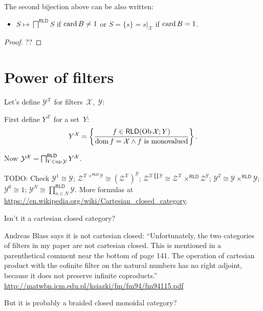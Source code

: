 \begin{prop}
  The second bijection above can be also written:

  
  \begin{itemize}
    \item $S \mapsto \bigsqcap^{\mathsf{RLD}} S$ if $\operatorname{card} B\ne 1$ or
      $S = \{s\} = s|_{\mathcal{X}}$ if $\operatorname{card} B=1$.
  \end{itemize}
\end{prop}

\begin{proof}
??
\end{proof}

\section{Power of filters}

Let's define $\mathcal{Y}^{\mathcal{X}}$ for filters~$\mathcal{X}$,~$\mathcal{Y}$:

First define $Y^{\mathcal{X}}$ for a set~$Y$:
\[ Y^{\mathcal{X}} = \left\{ \frac{ f \in \mathsf{RLD} (\operatorname{Ob} \mathcal{X}
   ; Y) }{ \operatorname{dom} f = \mathcal{X} \wedge f\text{ is monovalued} }\right\} . \]

Now $\mathcal{Y}^{\mathcal{X}} = \bigsqcap^{\mathsf{RLD}}_{Y \in
\operatorname{up} \mathcal{Y}} Y^{\mathcal{X}}$.

TODO: Check $\mathcal{Y}^1 \cong \mathcal{Y}$; $\mathcal{Z}^{\mathcal{X}
\times^{\mathsf{RLD}} \mathcal{Y}} \cong
(\mathcal{Z}^{\mathcal{X}})^{\mathcal{Y}}$; $\mathcal{Z}^{\mathcal{X} \amalg
\mathcal{Y}} \cong \mathcal{Z}^{\mathcal{X}} \times^{\mathsf{RLD}}
\mathcal{Z}^{\mathcal{Y}}$; $\mathcal{Y}^2 \cong \mathcal{Y}\times^{\mathsf{RLD}}\mathcal{Y}$;
$\mathcal{Y}^0 \cong 1$; $\mathcal{Y}^N \cong \prod^{\mathsf{RLD}}_{n\in N}\mathcal{Y}$.
More formulas at \url{https://en.wikipedia.org/wiki/Cartesian_closed_category}.

Isn't it a cartesian closed category?

Andreas Blass says it is not cartesian closed: ``Unfortunately, the two categories of filters in my paper are
not cartesian closed.  This is mentioned in a parenthetical comment
near the bottom of page 141.  The operation of cartesian product with
the cofinite filter on the natural numbers has no right adjoint,
because it does not preserve infinite coproducts.''
\url{http://matwbn.icm.edu.pl/ksiazki/fm/fm94/fm94115.pdf}

But it is probably a braided closed monoidal category?